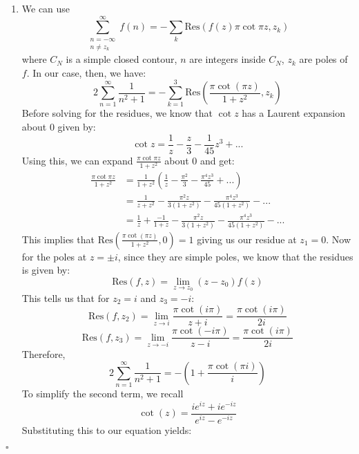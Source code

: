 \documentclass[11pt]{article}
\newenvironment{proof}{\noindent{\bf Proof.}}{\hfill $\square$\medskip}
\begin{document}
\begin{proof}
    \begin{enumerate}[label=\textbf{(\alph*)}]
        \item We can use
                $$\sum_{\substack{n=-\infty\\n\neq z_{k}}}^{\infty}f(n)=-\sum_{k}\text{Res}(f(z)\pi\cot\pi z,z_{k})$$
                where $C_{N}$ is a simple closed contour, $n$ are integers inside $C_{N}$, $z_{k}$ are poles of $f$. In our case, then, we have:
                $$2\sum_{n=1}^{\infty}\frac{1}{n^{2}+1}=-\sum_{k=1}^{3}\text{Res}\left(\frac{\pi\cot(\pi z)}{1+z^{2}},z_{k}\right)$$
                Before solving for the residues, we know that $\cot z$ has a Laurent expansion about $0$ given by:
                $$\cot z=\frac{1}{z}-\frac{z}{3}-\frac{1}{45}z^{3}+...$$
                Using this, we can expand $\frac{\pi\cot\pi z}{1+z^{2}}$ about $0$ and get:
                \begin{equation}
                    \begin{split}
                        \frac{\pi\cot\pi z}{1+z^{2}}&=\frac{1}{1+z^{2}}\left(\frac{1}{z}-\frac{\pi^{2}}{3}-\frac{\pi^{4}z^{3}}{45}+...\right)\\
                        &=\frac{1}{z+z^{2}}-\frac{\pi^{2}z}{3(1+z^{2})}-\frac{\pi^{4}z^{3}}{45(1+z^{2})}-...\\
                        &=\frac{1}{z}+\frac{-1}{1+z}-\frac{\pi^{2}z}{3(1+z^{2})}-\frac{\pi^{4}z^{3}}{45(1+z^{2})}-...
                    \end{split}
                \end{equation}
                This implies that $\text{Res}(\frac{\pi\cot(\pi z)}{1+z^{2}},0)=1$ giving us our residue at $z_{1}=0$. Now for the poles at $z=\pm i$, since they are simple poles, we know that the residues is given by:
                $$\text{Res}(f,z)=\lim_{z\to z_{0}}(z-z_{0})f(z)$$
                This tells us that for $z_{2}=i$ and $z_{3}=-i$:
                $$\text{Res}(f,z_{2})=\lim_{z\to i}\frac{\pi\cot(i\pi)}{z+i}=\frac{\pi\cot(i\pi)}{2i}$$
                $$\text{Res}(f,z_{3})=\lim_{z\to -i}\frac{\pi\cot(-i\pi)}{z-i}=\frac{\pi\cot(i\pi)}{2i}$$
                Therefore,
                $$2\sum_{n=1}^{\infty}\frac{1}{n^{2}+1}=-\left(1+\frac{\pi\cot(\pi i)}{i}\right)$$
                To simplify the second term, we recall
                $$\cot(z)=\frac{ie^{iz}+ie^{-iz}}{e^{iz}-e^{-iz}}$$
                Substituting this to our equation yields:
                \begin{equation}

\end{equation}
\end{enumerate}
\end{proof}
\end{document}
